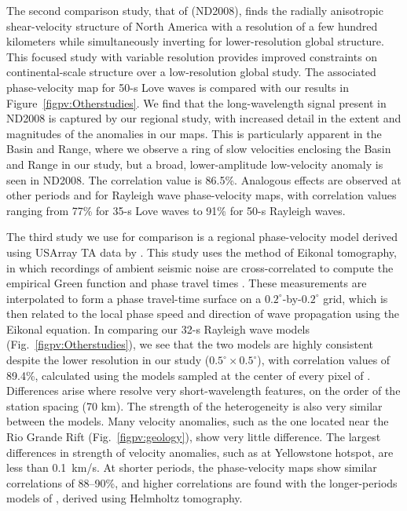 \documentclass[12pt,oneside]{book}
\newcommand{\degree}[1]{\mbox{$#1^{\circ}$}}
\begin{document}
The second comparison study, that of \citet{Nettles&Dziewonski2008} (ND2008), finds the radially anisotropic shear-velocity structure of North America with a resolution of a few hundred kilometers while simultaneously inverting for lower-resolution global structure. This focused study with variable resolution provides improved constraints on continental-scale structure over a low-resolution global study. The associated phase-velocity map for 50\nobreakdash-s Love waves \citep{NettlesThesis} is compared with our results in Figure~\ref{figpv:Otherstudies}. We find that the long-wavelength signal present in ND2008 is captured by our regional study, with increased detail in the extent and magnitudes of the anomalies in our maps. This is particularly apparent in the Basin and Range, where we observe a ring of slow velocities enclosing the Basin and Range in our study, but a broad, lower-amplitude low-velocity anomaly is seen in ND2008. The correlation value is 86.5\%. Analogous effects are observed at other periods and for Rayleigh wave phase-velocity maps, with correlation values ranging from 77\% for 35\nobreakdash-s Love waves to 91\% for 50\nobreakdash-s Rayleigh waves. 

The third study we use for comparison is a regional phase-velocity model derived using USArray TA data by \citet{Lin2009}. This study uses the method of Eikonal tomography, in which recordings of ambient seismic noise are cross-correlated to compute the empirical Green function and phase travel times \citep{Linetal2008}. These measurements are interpolated to form a phase travel-time surface on a \degree{0.2}\nobreakdash-by\nobreakdash-\degree{0.2} grid, which is then related to the local phase speed and direction of wave propagation using the Eikonal equation. In comparing our 32\nobreakdash-s Rayleigh wave models (Fig.~\ref{figpv:Otherstudies}), we see that the two models are highly consistent despite the lower resolution in our study ($\degree{0.5} \times \degree{0.5}$), with correlation values of 89.4\%, calculated using the models sampled at the center of every pixel of \citet{Lin2009}. Differences arise where \citet{Lin2009} resolve very short-wavelength features, on the order of the station spacing (70 km). The strength of the heterogeneity is also very similar between the models. Many velocity anomalies, such as the one located near the Rio Grande Rift (Fig.~\ref{figpv:geology}), show very little difference. The largest differences in strength of velocity anomalies, such as at Yellowstone hotspot, are less than 0.1~km/s. At shorter periods, the phase-velocity maps show similar correlations of 88--90\%, and higher correlations are found with the longer-periods models of \citet{LinRitzwoller2011}, derived using Helmholtz tomography. 
\end{document}
